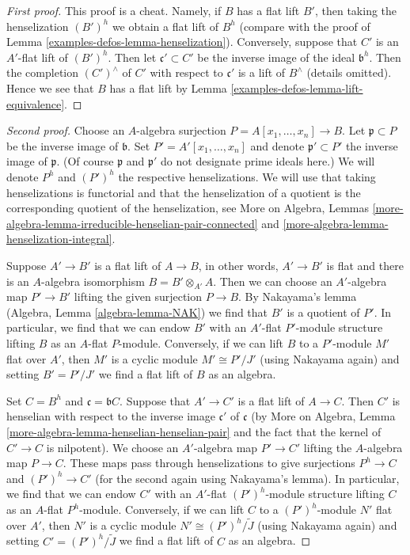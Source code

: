\begin{proof}[First proof]
This proof is a cheat. Namely, if $B$ has a flat lift $B'$, then
taking the henselization $(B')^h$ we obtain a flat lift of $B^h$
(compare with the proof of Lemma \ref{examples-defos-lemma-henselization}).
Conversely, suppose that $C'$ is an $A'$-flat lift of $(B')^h$.
Then let $\mathfrak c' \subset C'$ be the inverse image of the
ideal $\mathfrak b^h$. Then the completion $(C')^\wedge$ of
$C'$ with respect to $\mathfrak c'$ is a lift of $B^\wedge$ (details omitted).
Hence we see that $B$ has a flat lift by
Lemma \ref{examples-defos-lemma-lift-equivalence}.
\end{proof}

\begin{proof}[Second proof]
Choose an $A$-algebra surjection $P = A[x_1, \ldots, x_n] \to B$.
Let $\mathfrak p \subset P$ be the inverse image of $\mathfrak b$.
Set $P' = A'[x_1, \ldots, x_n]$ and denote $\mathfrak p' \subset P'$
the inverse image of $\mathfrak p$. (Of course $\mathfrak p$
and $\mathfrak p'$ do not designate prime ideals here.)
We will denote $P^h$ and $(P')^h$ the respective henselizations.
We will use that taking henselizations is functorial and that
the henselization of a quotient is the corresponding quotient
of the henselization, see
More on Algebra, Lemmas
\ref{more-algebra-lemma-irreducible-henselian-pair-connected} and
\ref{more-algebra-lemma-henselization-integral}.

\medskip\noindent
Suppose $A' \to B'$ is a flat lift of $A \to B$, in other words,
$A' \to B'$ is flat and there is an $A$-algebra isomorphism
$B = B' \otimes_{A'} A$. Then we can choose an $A'$-algebra map
$P' \to B'$ lifting the given surjection $P \to B$.
By Nakayama's lemma (Algebra, Lemma \ref{algebra-lemma-NAK})
we find that $B'$ is a quotient of $P'$. In particular, we find
that we can endow $B'$ with an $A'$-flat $P'$-module structure
lifting $B$ as an $A$-flat $P$-module.
Conversely, if we can lift $B$ to a $P'$-module $M'$ flat over $A'$,
then $M'$ is a cyclic module $M' \cong P'/J'$ (using Nakayama again)
and setting $B' = P'/J'$ we find a flat lift of $B$ as an algebra.

\medskip\noindent
Set $C = B^h$ and $\mathfrak c = \mathfrak bC$.
Suppose that $A' \to C'$ is a flat lift of $A \to C$.
Then $C'$ is henselian with respect to the inverse image
$\mathfrak c'$ of $\mathfrak c$
(by More on Algebra, Lemma \ref{more-algebra-lemma-henselian-henselian-pair}
and the fact that the kernel of $C' \to C$ is nilpotent).
We choose an $A'$-algebra map $P' \to C'$ lifting
the $A$-algebra map $P \to C$. These maps pass through
henselizations to give surjections $P^h \to C$ and $(P')^h \to C'$
(for the second again using Nakayama's lemma).
In particular, we find that we can endow $C'$ with an $A'$-flat
$(P')^h$-module structure lifting $C$ as an $A$-flat $P^h$-module.
Conversely, if we can lift $C$ to a $(P')^h$-module $N'$ flat over $A'$,
then $N'$ is a cyclic module $N' \cong (P')^h/\tilde J$
(using Nakayama again) and setting $C' = (P')^h/\tilde J$
we find a flat lift of $C$ as an algebra.


\end{proof}
